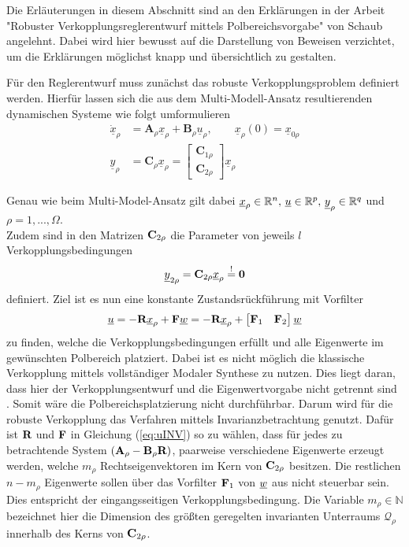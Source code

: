 
Die Erläuterungen in diesem Abschnitt sind an den Erklärungen in der Arbeit "Robuster Verkopplungsreglerentwurf mittels Polbereichsvorgabe" von Schaub \cite{Schaub} angelehnt. Dabei wird hier bewusst auf die Darstellung von Beweisen verzichtet, um die Erklärungen möglichst knapp und übersichtlich zu gestalten.

Für den Reglerentwurf muss zunächst das robuste Verkopplungsproblem definiert werden.
Hierfür lassen sich die aus dem Multi-Modell-Ansatz resultierenden dynamischen Systeme wie folgt umformulieren
\begin{align}
	\underline{\dot{x}}_{\rho}  &= \textbf{A}_\rho \underline{x}_{\rho} + \textbf{B}_\rho \underline{u}_{\rho}, \qquad \underline{x}_{\rho}(0) = \underline{x}_{0\rho} \\
	\underline{y}_{\rho} &= \textbf{C}_\rho\underline{x}_{\rho} = \begin{bmatrix}\textbf{C}_{1\rho} \\ \textbf{C}_{2\rho} \end{bmatrix} \underline{x}_{\rho}
\end{align}

Genau wie beim Multi-Model-Ansatz gilt dabei $\underline{x}_{\rho}\in \mathbb{R}^{n},\, \underline{u}\in \mathbb{R}^{p},\, \underline{y}_{\rho}\in \mathbb{R}^{q}$ und $\rho = 1, ..., \Omega$.\\
Zudem sind in den Matrizen $\textbf{C}_{2\rho}$ die Parameter von jeweils $l$ Verkopplungsbedingungen
\begin{align}\label{eq:Koppl}
	\underline{y}_{2\rho} = \textbf{C}_{2\rho} \underline{x}_{\rho} \stackrel{!}{=} \textbf{0}
\end{align}
definiert.
Ziel ist es nun eine konstante Zustandsrückführung mit Vorfilter
\begin{equation}\label{eq:uINV}
	\underline{u} = -\textbf{R}\underline{x}_{\rho} + \textbf{F}\underline{w} = -\textbf{R}\underline{x}_{\rho} + \begin{bmatrix}\textbf{F}_{1} & \textbf{F}_{2} \end{bmatrix} \underline{w}
\end{equation}
zu finden, welche die Verkopplungsbedingungen erfüllt und alle Eigenwerte im gewünschten Polbereich platziert.
Dabei ist es nicht möglich die klassische Verkopplung mittels vollständiger Modaler Synthese zu nutzen. Dies liegt daran, dass hier der Verkopplungsentwurf und die Eigenwertvorgabe nicht getrennt sind \cite{Schaub}. Somit wäre die Polbereichsplatzierung nicht durchführbar. 
Darum wird für die robuste Verkopplung das Verfahren mittels Invarianzbetrachtung genutzt.
Dafür ist $\textbf{R}$ und $\textbf{F}$ in Gleichung (\ref{eq:uINV}) so zu wählen, dass für jedes zu betrachtende System $(\textbf{A}_{\rho}-\textbf{B}_{\rho}\textbf{R})$, paarweise verschiedene Eigenwerte erzeugt werden, welche $m_\rho$ Rechtseigenvektoren im Kern von $\textbf{C}_{2\rho}$ besitzen. Die restlichen $n-m_\rho$ Eigenwerte sollen über das Vorfilter $\textbf{F}_1$ von $\underline{w}$ aus nicht steuerbar sein. Dies entspricht der eingangsseitigen Verkopplungsbedingung.
Die Variable $m_\rho \in \mathbb{N}$ bezeichnet hier die Dimension des größten geregelten invarianten Unterraums $\mathcal{Q}_\rho$ innerhalb des Kerns von $\textbf{C}_{2\rho}$.

